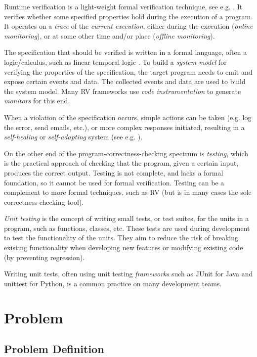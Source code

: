 \documentclass[a4paper,11pt]{article}
\begin{document}
Runtime verification is a light-weight formal verification technique, see e.g. \cite{leucker08,delgado04}.
It verifies whether some specified properties hold during the execution of a
program. It operates on a \emph{trace} of the \emph{current execution}, either
during the execution (\emph{online monitoring}), or at some other time and/or place
(\emph{offline monitoring}).

The specification that should be verified is written in a formal
language, often a logic/calculus, such as linear temporal logic
\cite{pnueli77}. To build
a \emph{system model} for verifying the properties of the specification, the target program
needs to emit and expose certain events and data. The collected events and data are used to build the system model. Many RV frameworks use \textit{code instrumentation}
to generate \textit{monitors} for this end.

When a violation of the specification occurs, simple actions can be taken (e.g. log the error, send emails, etc.), or more complex responses initiated, resulting in a \textit{self-healing} or \textit{self-adapting} system (see e.g. \cite{huebscher08}).

On the other end of the program-correctness-checking spectrum is \emph{testing}, which is the
practical approach of checking that the program, given a certain input, produces the correct output.
Testing is not complete, and lacks a formal foundation, so it cannot be used for formal verification. 
Testing can be a complement to more formal techniques, such as RV (but is in many cases the sole correctness-checking tool).

\textit{Unit testing} is the concept of writing small tests, or test suites, for the units in
a program, such as functions, classes, etc. These tests are used during development to test the 
functionality of the units. They aim to reduce the risk of breaking existing functionality when 
developing new features or modifying existing code (by preventing regression).

Writing unit tests, often using unit testing \textit{frameworks} such as JUnit \cite{junit}
for Java and unittest \cite{python-unittest} for Python, is a common practice on many
development teams.


\section{Problem}

\subsection{Problem Definition}
\end{document}

